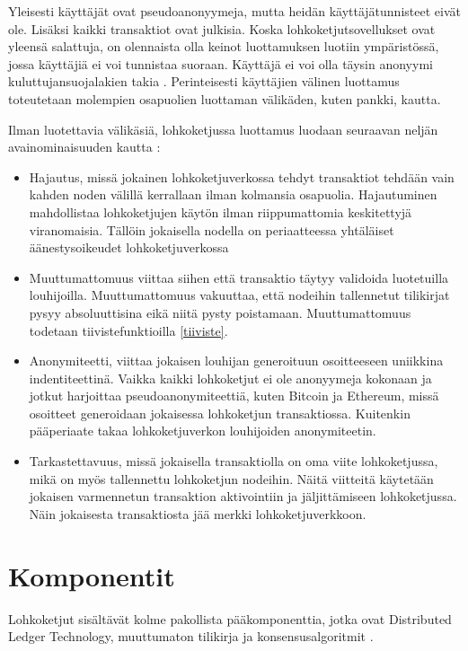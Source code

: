 \documentclass[utf8,bachelor]{gradu3}
\begin{document}
Yleisesti käyttäjät ovat pseudoanonyymeja, mutta heidän käyttäjätunnisteet eivät ole. 
Lisäksi kaikki transaktiot ovat julkisia. 
Koska lohkoketjutsovellukset ovat yleensä salattuja, on olennaista olla keinot luottamuksen luotiin ympäristössä, jossa käyttäjiä ei voi tunnistaa suoraan. 
Käyttäjä ei voi olla täysin anonyymi kuluttujansuojalakien takia \parencite{yaga2019blockchain}.
Perinteisesti käyttäjien välinen luottamus toteutetaan molempien osapuolien luottaman välikäden, kuten pankki, kautta.

Ilman luotettavia välikäsiä, lohkoketjussa luottamus luodaan seuraavan neljän avainominaisuuden kautta \parencite{zarrin2021blockchain}:

\begin{itemize}

\item Hajautus, missä jokainen lohkoketjuverkossa tehdyt transaktiot tehdään vain kahden noden välillä kerrallaan ilman kolmansia osapuolia. Hajautuminen mahdollistaa lohkoketjujen käytön ilman riippumattomia keskitettyjä viranomaisia. Tällöin jokaisella nodella on periaatteessa yhtäläiset äänestysoikeudet lohkoketjuverkossa

\item Muuttumattomuus viittaa siihen että transaktio täytyy validoida luotetuilla louhijoilla. Muuttumattomuus vakuuttaa, että nodeihin tallennetut tilikirjat pysyy absoluuttisina eikä niitä pysty poistamaan. Muuttumattomuus todetaan tiivistefunktioilla \ref{tiiviste}.


\item Anonymiteetti, viittaa jokaisen louhijan generoituun osoitteeseen uniikkina indentiteettinä. Vaikka kaikki lohkoketjut ei ole anonyymeja kokonaan ja jotkut harjoittaa pseudoanonymiteettiä, kuten Bitcoin ja Ethereum, missä osoitteet generoidaan jokaisessa lohkoketjun transaktiossa. Kuitenkin pääperiaate takaa lohkoketjuverkon louhijoiden anonymiteetin. 

\item Tarkastettavuus, missä jokaisella transaktiolla on oma viite lohkoketjussa, mikä on myös tallennettu lohkoketjun nodeihin. Näitä viitteitä käytetään jokaisen varmennetun transaktion aktivointiin ja jäljittämiseen lohkoketjussa. Näin jokaisesta transaktiosta jää merkki lohkoketjuverkkoon.
 
 \end{itemize}


\section{Komponentit}
Lohkoketjut sisältävät kolme pakollista pääkomponenttia, jotka ovat Distributed Ledger Technology, muuttumaton tilikirja ja konsensusalgoritmit \parencite{zarrin2021blockchain}.
\end{document}
